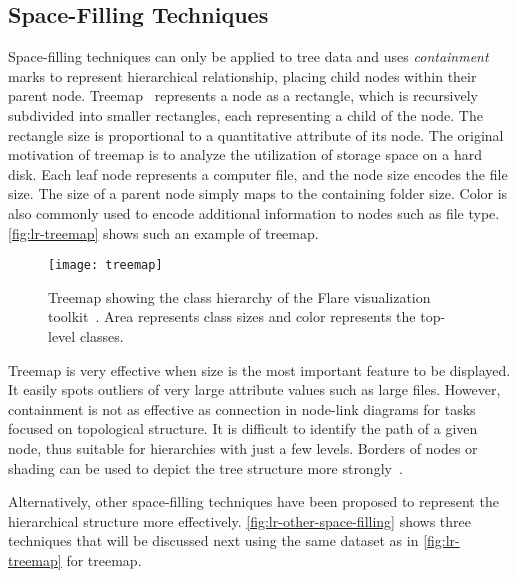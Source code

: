 \subsection{Space-Filling Techniques}
Space-filling techniques can only be applied to tree data and uses \emph{containment} marks to represent hierarchical relationship, placing child nodes within their parent node. Treemap~\cite{Shneiderman1992} represents a node as a rectangle, which is recursively subdivided into smaller rectangles, each representing a child of the node. The rectangle size is proportional to a quantitative attribute of its node. The original motivation of treemap is to analyze the utilization of storage space on a hard disk. Each leaf node represents a computer file, and the node size encodes the file size. The size of a parent node simply maps to the containing folder size. Color is also commonly used to encode additional information to nodes such as file type. \autoref{fig:lr-treemap} shows such an example of treemap.

\begin{figure}[!htb]
	\centering
	\texttt{[image: treemap]}
	\caption{Treemap showing the class hierarchy of the Flare visualization toolkit~\cite{Heer2009b}. Area represents class sizes and color represents the top-level classes.}
	\label{fig:lr-treemap}
\end{figure}

Treemap is very effective when size is the most important feature to be displayed. It easily spots outliers of very large attribute values such as large files. However, containment is not as effective as connection in node-link diagrams for tasks focused on topological structure. It is difficult to identify the path of a given node, thus suitable for hierarchies with just a few levels. Borders of nodes or shading can be used to depict the tree structure more strongly~\cite{Wijk1999}.

Alternatively, other space-filling techniques have been proposed to represent the hierarchical structure more effectively. \autoref{fig:lr-other-space-filling} shows three techniques that will be discussed next using the same dataset as in \autoref{fig:lr-treemap} for treemap. 

